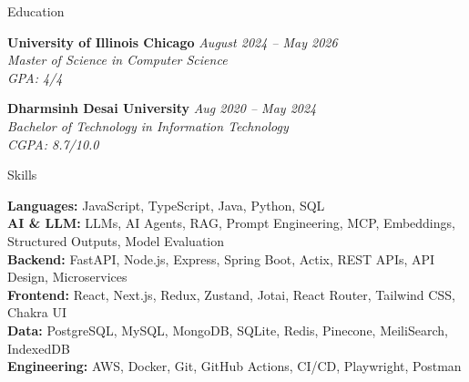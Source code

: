 \documentclass{resume}
\begin{document}

\begin{rSection}{Education}

{\bf University of Illinois Chicago} \hfill {\em August 2024 -- May 2026} \\
\textit{Master of Science in Computer Science} \\
\textit{GPA: 4/4}

\smallskip
{\bf Dharmsinh Desai University} \hfill {\em Aug 2020 -- May 2024} \\
\textit{Bachelor of Technology in Information Technology} \\
\textit{CGPA: 8.7/10.0}

\end{rSection}


\begin{rSection}{Skills}

\textbf{Languages:} JavaScript, TypeScript, Java, Python, SQL \\
\textbf{AI \& LLM:} LLMs, AI Agents, RAG, Prompt Engineering, MCP, Embeddings, Structured Outputs, Model Evaluation \\
\textbf{Backend:} FastAPI, Node.js, Express, Spring Boot, Actix, REST APIs, API Design, Microservices \\
\textbf{Frontend:} React, Next.js, Redux, Zustand, Jotai, React Router, Tailwind CSS, Chakra UI \\
\textbf{Data:} PostgreSQL, MySQL, MongoDB, SQLite, Redis, Pinecone, MeiliSearch, IndexedDB \\
\textbf{Engineering:} AWS, Docker, Git, GitHub Actions, CI/CD, Playwright, Postman

\end{rSection}

\end{document}
